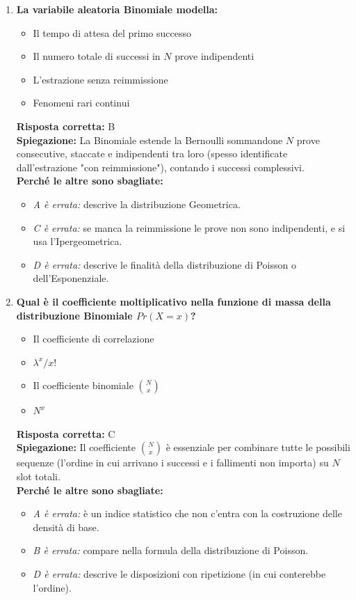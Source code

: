 \documentclass[12pt, a4paper]{article}
\begin{document}
\begin{enumerate}[label=\textbf{\arabic*.}]
    \item \textbf{La variabile aleatoria Binomiale modella:}
    \begin{itemize}
        \item[A)] Il tempo di attesa del primo successo
        \item[B)] Il numero totale di successi in $N$ prove indipendenti
        \item[C)] L'estrazione senza reimmissione
        \item[D)] Fenomeni rari continui
    \end{itemize}
    \textbf{Risposta corretta:} B \\
    \textbf{Spiegazione:} La Binomiale estende la Bernoulli sommandone $N$ prove consecutive, staccate e indipendenti tra loro (spesso identificate dall'estrazione "con reimmissione"), contando i successi complessivi. \\
    \textbf{Perché le altre sono sbagliate:}
    \begin{itemize}
        \item \textit{A è errata:} descrive la distribuzione Geometrica.
        \item \textit{C è errata:} se manca la reimmissione le prove non sono indipendenti, e si usa l'Ipergeometrica.
        \item \textit{D è errata:} descrive le finalità della distribuzione di Poisson o dell'Esponenziale.
    \end{itemize}

    \item \textbf{Qual è il coefficiente moltiplicativo nella funzione di massa della distribuzione Binomiale $Pr(X=x)$?}
    \begin{itemize}
        \item[A)] Il coefficiente di correlazione
        \item[B)] $\lambda^x / x!$
        \item[C)] Il coefficiente binomiale $\binom{N}{x}$
        \item[D)] $N^x$
    \end{itemize}
    \textbf{Risposta corretta:} C \\
    \textbf{Spiegazione:} Il coefficiente $\binom{N}{x}$ è essenziale per combinare tutte le possibili sequenze (l'ordine in cui arrivano i successi e i fallimenti non importa) su $N$ slot totali. \\
    \textbf{Perché le altre sono sbagliate:}
    \begin{itemize}
        \item \textit{A è errata:} è un indice statistico che non c'entra con la costruzione delle densità di base.
        \item \textit{B è errata:} compare nella formula della distribuzione di Poisson.
        \item \textit{D è errata:} descrive le disposizioni con ripetizione (in cui conterebbe l'ordine).
    \end{itemize}


\end{enumerate}
\end{document}
